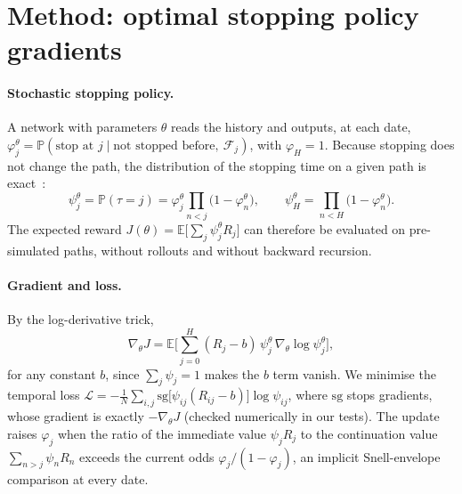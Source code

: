 \section{Method: optimal stopping policy gradients}
\label{sec:method}

\paragraph{Stochastic stopping policy.}
A network with parameters $\theta$ reads the history and outputs, at each date,
$\varphi^\theta_j=\mathbb P(\text{stop at } j\mid\text{not stopped before},\ \mathcal F_j)$,
with $\varphi_H=1$. Because stopping does not change the path, the distribution of the
stopping time on a given path is exact~\cite{ospg2023}:
\begin{equation}
\psi^\theta_j=\mathbb P(\tau=j)=\varphi^\theta_j\prod_{n<j}\big(1-\varphi^\theta_n\big),\qquad
\psi^\theta_H=\prod_{n<H}\big(1-\varphi^\theta_n\big).
\end{equation}
The expected reward $J(\theta)=\mathbb E\big[\sum_{j}\psi^\theta_j R_j\big]$ can therefore be
evaluated on pre-simulated paths, without rollouts and without backward recursion.

\paragraph{Gradient and loss.}
By the log-derivative trick,
\begin{equation}
\nabla_\theta J=\mathbb E\Big[\sum_{j=0}^{H}(R_j-b)\,\psi^\theta_j\,\nabla_\theta\log\psi^\theta_j\Big],
\end{equation}
for any constant $b$, since $\sum_j\psi_j=1$ makes the $b$ term vanish. We minimise the
temporal loss $\mathcal L=-\frac1N\sum_{i,j}\mathrm{sg}\big[\psi_{ij}(R_{ij}-b)\big]\log\psi_{ij}$,
where $\mathrm{sg}$ stops gradients, whose gradient is exactly $-\nabla_\theta J$ (checked
numerically in our tests). The update raises $\varphi_j$ when the ratio of the immediate
value $\psi_jR_j$ to the continuation value $\sum_{n>j}\psi_nR_n$ exceeds the current odds
$\varphi_j/(1-\varphi_j)$, an implicit Snell-envelope comparison at every date.

